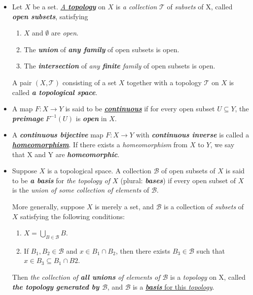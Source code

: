 \documentclass[11pt]{article}
\begin{document}
\begin{itemize}
\item 
\begin{definition} 
Let $X$ be a set. \underline{\emph{A \textbf{topology}}} on $X$ is \emph{a collection} $\mathscr{T}$ of \emph{subsets} of X, called \emph{\textbf{open subsets}}, satisfying
\begin{enumerate}
\item $X$ and $\emptyset$ are \emph{open}.
\item The \emph{\textbf{union}} of \emph{\textbf{any family}} of open subsets is open.
\item The \emph{\textbf{intersection}} of \emph{any \textbf{finite} family} of open subsets is open.
\end{enumerate}
A pair $(X, \mathscr{T})$ consisting of a set $X$ together with a topology $\mathscr{T}$ on $X$ is called \emph{\textbf{a topological space}}.
\end{definition}

\item \begin{definition}
A map $F: X \rightarrow Y$ is said to be \underline{\emph{\textbf{continuous}}} if for every open subset $U \subseteq Y$, the \emph{\textbf{preimage}} $F^{-1}(U)$ is \emph{\textbf{open}} in $X$.
\end{definition}

\item \begin{definition}
A \emph{\textbf{continuous bijective}} map $F: X \rightarrow Y$ with \emph{\textbf{continuous inverse}} is called a \underline{\emph{\textbf{homeomorphism}}}. If there exists a \emph{homeomorphism} from $X$ to $Y$, we say that X and Y are \emph{\textbf{homeomorphic}}.
\end{definition}

\item \begin{definition}
Suppose $X$ is a topological space. A collection $\mathscr{B}$ of open subsets of $X$ is said to be \emph{\textbf{a basis}} for \emph{the topology of $X$} (plural: \emph{\textbf{bases}}) if every open subset of $X$ is the \emph{union of some collection of elements} of $\mathscr{B}$.

More generally, suppose $X$ is merely a set, and $\mathscr{B}$ is a collection of \emph{subsets} of $X$ satisfying the following conditions:
\begin{enumerate}
\item $X = \bigcup_{B \in \mathscr{B}}B$.
\item If $B_1, B_2 \in \mathscr{B}$ and $x \in B_1 \cap B_2$, then there exists $B_3 \in \mathscr{B}$ such that $x \in B_3 \subseteq B_1 \cap B2$.
\end{enumerate}
Then \emph{the collection of \textbf{all unions} of elements of $\mathscr{B}$} is a \emph{topology} on X, called \emph{\textbf{the topology generated by $\mathscr{B}$}}, and $\mathscr{B}$ is a \underline{\emph{\textbf{basis}} for this \emph{topology}}.
\end{definition}


\end{itemize}
\end{document}
